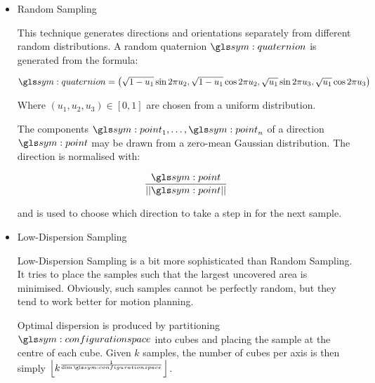 				\begin{itemize}

					\item Random Sampling

						This technique generates directions and orientations
						separately from different random distributions.  A
						random quaternion $\quaternion$ is generated from the
						formula\cite{bib:planning:planning_algorithms}:

						\begin{equation}
							\quaternion =
								\left(
									\sqrt
									{%
										1 - u_1
									}
									\sin
										2\pi u_2
									,
									\sqrt
									{%
										1 - u_1
									}
									\cos
										2\pi u_2
									,
									\sqrt
									{%
										u_1
									}
									\sin
										2\pi u_3
									,
									\sqrt
									{%
										u_1
									}
									\cos
										2\pi u_3
								\right)
						\end{equation}

						Where
						\(
							(u_1, u_2, u_3) \in [0, 1]
						\)
						are chosen from a uniform distribution.

						The components
						\(
							\point_1, \ldots, \point_n
						\)
						of a direction $\point$ may be drawn from a zero-mean
						Gaussian distribution. The direction is normalised with:

						\begin{equation}
							\frac{\point}{\norm{\point}}
						\end{equation}

						and is used to choose which direction to take a step in
						for the next sample.

					\item Low-Dispersion Sampling

						Low-Dispersion Sampling is a bit more sophisticated than
						Random Sampling. It tries to place the samples such that
						the largest uncovered area is minimised. Obviously, such
						samples cannot be perfectly random, but they tend to
						work better for motion planning.


						Optimal dispersion is produced by partitioning
						$\configurationspace$ into cubes and placing the sample
						at the centre of each cube. Given $k$ samples, the
						number of cubes per axis is then simply
						\(
							\floor*{k^{\frac{1}{\dim{\configurationspace}}}}
						\).


\end{itemize}
